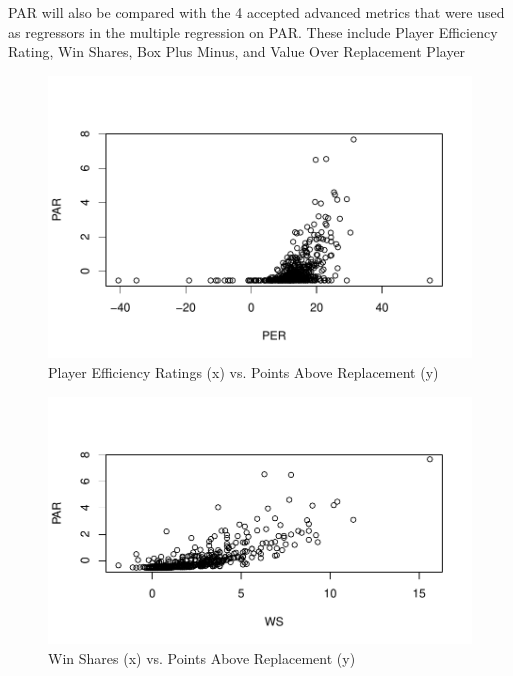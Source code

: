 \documentclass[12pt, titlepage]{article}
\begin{document}
PAR will also be compared with the 4 accepted advanced metrics that were used as regressors in the 
multiple regression on PAR. These include Player Efficiency Rating, Win Shares, Box Plus Minus, and 
Value Over Replacement Player

\begin{figure}[H]
  \centering
  \includegraphics[scale = 0.6]{PERvsPAR}
  \caption{Player Efficiency Ratings (x) vs. Points Above Replacement (y)}
  \label{fig:Fig1}
\end{figure}

\begin{figure}[H]
  \centering
  \includegraphics[scale = 0.6]{WSvsPAR}
  \caption{Win Shares (x) vs. Points Above Replacement (y)}
  \label{fig:Fig2}
\end{figure}
\end{document}
